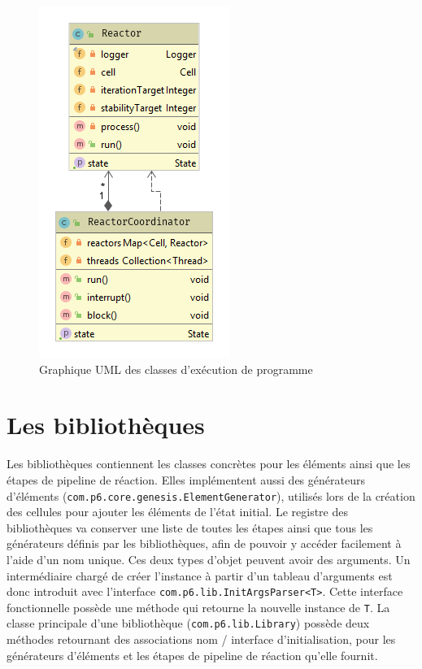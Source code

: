 \documentclass[a4paper, 12pt]{article}
\newcommand{\inline}[1]{\texttt{#1}}
\begin{document}
\begin{figure}[!ht]
  \centering
  \includegraphics[scale=0.8]{./img/Core_reactor.png}
  \caption{Graphique UML des classes d'exécution de programme}
\end{figure}

\section{Les bibliothèques}
Les bibliothèques contiennent les classes concrètes pour les éléments ainsi que les étapes de pipeline de réaction. Elles implémentent aussi des générateurs d’éléments (\inline{com.p6.core.genesis.ElementGenerator}), utilisés lors de la création des cellules pour ajouter les éléments de l’état initial. Le registre des bibliothèques va conserver une liste de toutes les étapes ainsi que tous les générateurs définis par les bibliothèques, afin de pouvoir y accéder facilement à l’aide d’un nom unique. Ces deux types d’objet peuvent avoir des arguments. Un intermédiaire chargé de créer l’instance à partir d’un tableau d’arguments est donc introduit avec l’interface \inline{com.p6.lib.InitArgsParser<T>}. Cette interface fonctionnelle possède une méthode qui retourne la nouvelle instance de \inline{T}. La classe principale d’une bibliothèque (\inline{com.p6.lib.Library}) possède deux méthodes retournant des associations nom / interface d’initialisation, pour les générateurs d’éléments et les étapes de pipeline de réaction qu’elle fournit.
\end{document}
